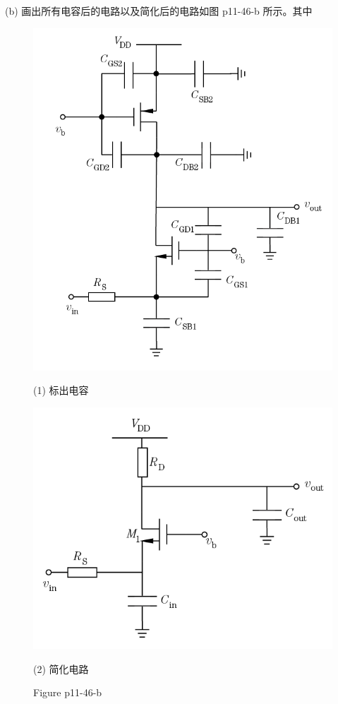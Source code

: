 \documentclass[hyperref, UTF8]{ctexart}
\begin{document}
    (b) 画出所有电容后的电路以及简化后的电路如图 p11-46-b 所示。其中
    \begin{figure}[!htb]
        \centering
        \begin{minipage}[t]{0.439\textwidth}
        \centering
        \includegraphics[width=1\textwidth]{p11-46-b-sol1.png}
        \caption*{(1) 标出电容}
        \end{minipage}
        \begin{minipage}[t]{0.400\textwidth}
        \centering
        \includegraphics[width=1\textwidth]{p11-46-b-sol2.png}
        \caption*{(2) 简化电路}
        \end{minipage}
        \caption*{Figure p11-46-b}
    \end{figure}
\end{document}
